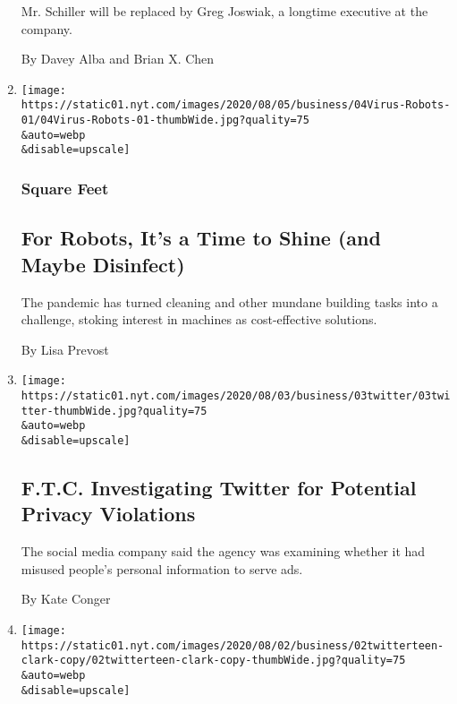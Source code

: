 \begin{enumerate}
  Mr. Schiller will be replaced by Greg Joswiak, a longtime executive at
  the company.

  By Davey Alba and Brian X. Chen
\item
  \href{/2020/08/04/business/robot-cleaning-coronavirus.html}{}

  \texttt{[image: https://static01.nyt.com/images/2020/08/05/business/04Virus-Robots-01/04Virus-Robots-01-thumbWide.jpg?quality=75\\\&auto=webp\\\&disable=upscale]}

  \hypertarget{square-feet}{%
  \subsubsection{Square Feet}\label{square-feet}}

  \hypertarget{for-robots-its-a-time-to-shine-and-maybe-disinfect}{%
  \subsection{For Robots, It's a Time to Shine (and Maybe
  Disinfect)}\label{for-robots-its-a-time-to-shine-and-maybe-disinfect}}

  The pandemic has turned cleaning and other mundane building tasks into
  a challenge, stoking interest in machines as cost-effective solutions.

  By Lisa Prevost
\item
  \href{/2020/08/03/technology/ftc-twitter-privacy-violations.html}{}

  \texttt{[image: https://static01.nyt.com/images/2020/08/03/business/03twitter/03twitter-thumbWide.jpg?quality=75\\\&auto=webp\\\&disable=upscale]}

  \hypertarget{ftc-investigating-twitter-for-potential-privacy-violations}{%
  \subsection{F.T.C. Investigating Twitter for Potential Privacy
  Violations}\label{ftc-investigating-twitter-for-potential-privacy-violations}}

  The social media company said the agency was examining whether it had
  misused people's personal information to serve ads.

  By Kate Conger
\item
  \href{/2020/08/02/technology/florida-teenager-twitter-hack.html}{}

  \texttt{[image: https://static01.nyt.com/images/2020/08/02/business/02twitterteen-clark-copy/02twitterteen-clark-copy-thumbWide.jpg?quality=75\\\&auto=webp\\\&disable=upscale]}


\end{enumerate}
